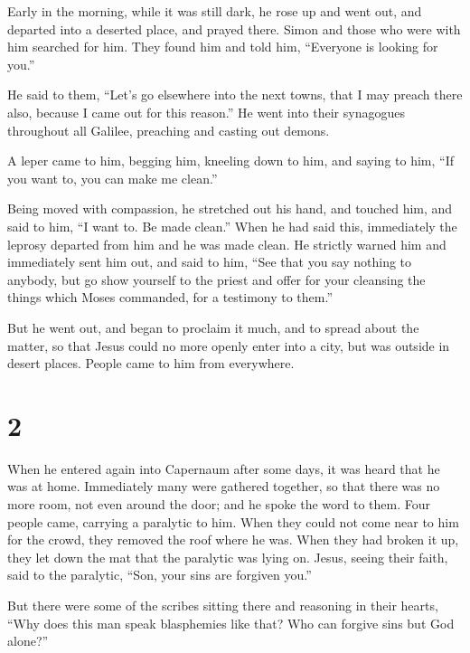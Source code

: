  Early in the morning, while it was still dark, he rose
up and went out, and departed into a deserted place, and prayed there.
 Simon and those who were with him searched for him.
 They found him and told him, ``Everyone is looking for
you.''

 He said to them, ``Let's go elsewhere into the next
towns, that I may preach there also, because I came out for this
reason.''  He went into their synagogues throughout all
Galilee, preaching and casting out demons.

 A leper came to him, begging him, kneeling down to him,
and saying to him, ``If you want to, you can make me clean.''

 Being moved with compassion, he stretched out his hand,
and touched him, and said to him, ``I want to. Be made clean.''
 When he had said this, immediately the leprosy departed
from him and he was made clean.  He strictly warned him
and immediately sent him out,  and said to him, ``See
that you say nothing to anybody, but go show yourself to the priest and
offer for your cleansing the things which Moses commanded, for a
testimony to them.''

 But he went out, and began to proclaim it much, and to
spread about the matter, so that Jesus could no more openly enter into a
city, but was outside in desert places. People came to him from
everywhere.

\hypertarget{section-1}{%
\section{2}\label{section-1}}

 When he entered again into Capernaum after some days, it
was heard that he was at home.  Immediately many were
gathered together, so that there was no more room, not even around the
door; and he spoke the word to them.  Four people came,
carrying a paralytic to him.  When they could not come
near to him for the crowd, they removed the roof where he was. When they
had broken it up, they let down the mat that the paralytic was lying on.
 Jesus, seeing their faith, said to the paralytic, ``Son,
your sins are forgiven you.''

 But there were some of the scribes sitting there and
reasoning in their hearts,  ``Why does this man speak
blasphemies like that? Who can forgive sins but God alone?''

